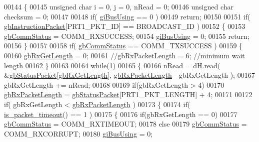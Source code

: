 \begin{DoxyCode}
00144 \{
00145     \textcolor{keywordtype}{unsigned} \textcolor{keywordtype}{char} i = 0, j = 0, nRead = 0;
00146     \textcolor{keywordtype}{unsigned} \textcolor{keywordtype}{char} checksum = 0;
00147 
00148     \textcolor{keywordflow}{if}( \hyperlink{a00004_ad10e0e49f5fef04bf789a89c14cc470a}{giBusUsing} == 0 )
00149         \textcolor{keywordflow}{return};
00150 
00151     \textcolor{keywordflow}{if}( \hyperlink{a00004_afd94dcf01b8e96298727776e222de722}{gbInstructionPacket}[PRT1\_PKT\_ID] == BROADCAST\_ID )
00152     \{
00153         \hyperlink{a00004_a5b603f6bed7ccc595f1f50bd6a6ebbfc}{gbCommStatus} = COMM\_RXSUCCESS;
00154         \hyperlink{a00004_ad10e0e49f5fef04bf789a89c14cc470a}{giBusUsing} = 0;
00155         \textcolor{keywordflow}{return};
00156     \}
00157     
00158     \textcolor{keywordflow}{if}( \hyperlink{a00004_a5b603f6bed7ccc595f1f50bd6a6ebbfc}{gbCommStatus} == COMM\_TXSUCCESS )
00159     \{
00160         \hyperlink{a00004_a9d590ce24791d111c2db9b66be1e046d}{gbRxGetLength} = 0;
00161         \textcolor{comment}{//gbRxPacketLength = 6; //minimum wait length}
00162     \}
00163     
00164     \textcolor{keywordflow}{while}(1)
00165     \{
00166         nRead = \hyperlink{a00004_ae003cc90ada6d7b70eaa4ea9d42d4deb}{dH}.\hyperlink{a00003_ac36331febb2eaa66303af3483795742a}{read}( &\hyperlink{a00004_aa57c86d3bbbeaf5c9d4f6bd00376b04f}{gbStatusPacket}[\hyperlink{a00004_a9d590ce24791d111c2db9b66be1e046d}{gbRxGetLength}], 
      \hyperlink{a00004_a333686e1b5903d16c41df8172b6bd5a8}{gbRxPacketLength} - gbRxGetLength );
00167         gbRxGetLength += nRead;
00168 
00169         \textcolor{keywordflow}{if}(gbRxGetLength > 4)
00170             \hyperlink{a00004_a333686e1b5903d16c41df8172b6bd5a8}{gbRxPacketLength} = \hyperlink{a00004_aa57c86d3bbbeaf5c9d4f6bd00376b04f}{gbStatusPacket}[PRT1\_PKT\_LENGTH] + 4;
00171 
00172         \textcolor{keywordflow}{if}( gbRxGetLength < \hyperlink{a00004_a333686e1b5903d16c41df8172b6bd5a8}{gbRxPacketLength} )
00173         \{
00174             \textcolor{keywordflow}{if}( \hyperlink{a00004_a00d08481ebc4dee19debecf43f888522}{is\_packet\_timeout}() == 1 )
00175             \{
00176                 \textcolor{keywordflow}{if}(gbRxGetLength == 0)
00177                     \hyperlink{a00004_a5b603f6bed7ccc595f1f50bd6a6ebbfc}{gbCommStatus} = COMM\_RXTIMEOUT;
00178                 \textcolor{keywordflow}{else}
00179                     \hyperlink{a00004_a5b603f6bed7ccc595f1f50bd6a6ebbfc}{gbCommStatus} = COMM\_RXCORRUPT;
00180                 \hyperlink{a00004_ad10e0e49f5fef04bf789a89c14cc470a}{giBusUsing} = 0;

\end{DoxyCode}
